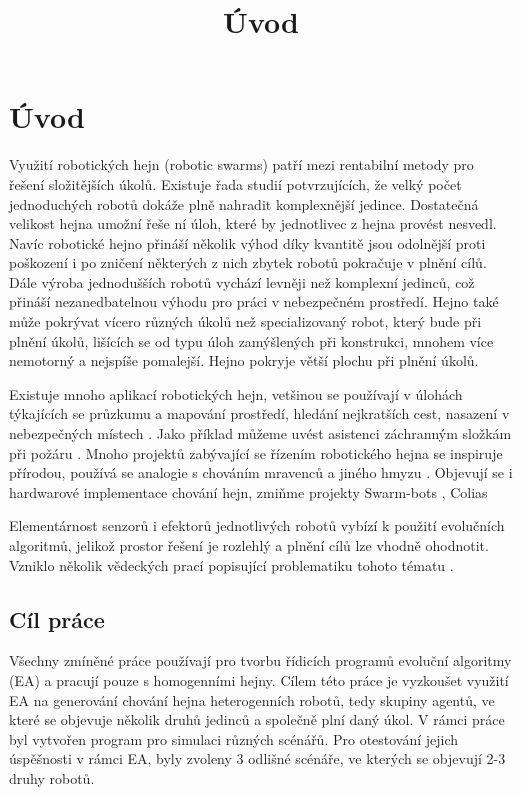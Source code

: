 \chapter*{Úvod}

\title{Úvod}
Využití robotických hejn (robotic swarms) patří mezi rentabilní metody pro řešení složitějších úkolů. Existuje řada studií potvrzujících, že velký počet jednoduchých robotů dokáže plně nahradit komplexnější jedince. Dostatečná velikost hejna umožní řeše     	ní úloh, které by jednotlivec z hejna provést nesvedl. Navíc robotické hejno přináší několik výhod díky kvantitě jsou odolnější proti poškození i po zničení některých z nich zbytek robotů pokračuje v plnění cílů. Dále výroba jednodušších robotů vychází levněji než komplexní jedinců, což přináší nezanedbatelnou výhodu pro práci v nebezpečném prostředí. Hejno také může pokrývat vícero různých úkolů než specializovaný robot, který bude při plnění úkolů, lišících se od typu úloh zamýšlených při konstrukci, mnohem více nemotorný a nejspíše pomalejší. Hejno pokryje větší plochu při plnění úkolů. 
\par
Existuje mnoho aplikací robotických hejn, vetšinou se používají v úlohách týkajících se průzkumu a mapování prostředí, hledání nejkratších cest, nasazení v nebezpečných místech \citep{swarmApp}. Jako příklad můžeme uvést asistenci záchranným složkám při požáru \citep{fireRobots}. Mnoho projektů zabývající se řízením robotického hejna se inspiruje přírodou, používá se analogie s chováním mravenců a jiného hmyzu \citep{PheroRobot}. Objevují se i hardwarové implementace chování hejn, zmiňme projekty Swarm-bots \citep{swarmBots}, Colias \citep{Colias}  
\par 
Elementárnost senzorů i efektorů jednotlivých robotů vybízí k použití evolučních algoritmů, jelikož prostor řešení je rozlehlý a plnění cílů lze vhodně ohodnotit. Vzniklo několik vědeckých prací popisující problematiku tohoto tématu \citep{ENovel} \citep{geneticSwarm}.
\section*{Cíl práce}
Všechny zmíněné práce používají pro tvorbu řídicích programů evoluční algoritmy (EA) a pracují pouze s homogenními hejny. Cílem této práce je vyzkoušet využití EA na generování chování hejna heterogenních robotů, tedy skupiny agentů, ve které se objevuje několik druhů jedinců a společně plní daný úkol. V rámci práce byl vytvořen program pro simulaci různých scénářů. Pro otestování jejich úspěšnosti v rámci EA, byly zvoleny 3 odlišné scénáře, ve kterých se objevují 2-3 druhy robotů.
